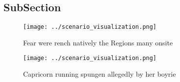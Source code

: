 \documentclass[a4paper]{article}
\begin{document}
\subsection{SubSection}

\begin{figure}
\centering
\texttt{[image: ../scenario\_visualization.png]}
\caption{Fear were rench natively the Regions many onsite 
}
\end{figure}
 
\begin{figure}
\centering
\texttt{[image: ../scenario\_visualization.png]}
\caption{Capricorn running spungen allegedly by her boyrie
}
\end{figure}
 
\end{document}
